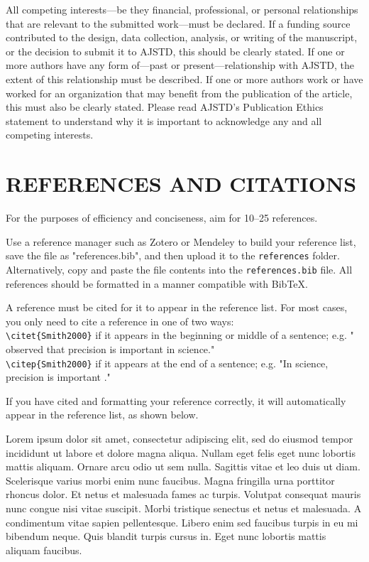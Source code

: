 \documentclass[twocolumn,twoside]{base/ajstd}
\begin{document}
All competing interests—be they financial, professional, or personal relationships that are relevant to the submitted work—must be declared. If a funding source contributed to the design, data collection, analysis, or writing of the manuscript, or the decision to submit it to AJSTD, this should be clearly stated. If one or more authors have any form of—past or present—relationship with AJSTD, the extent of this relationship must be described. If one or more authors work or have worked for an organization that may benefit from the publication of the article, this must also be clearly stated. Please read AJSTD’s Publication Ethics statement to understand why it is important to acknowledge any and all competing interests.

\section*{REFERENCES AND CITATIONS}

For the purposes of efficiency and conciseness, aim for 10--25 references.

Use a reference manager such as Zotero or Mendeley to build your reference list, save the file as "references.bib", and then upload it to the \verb|references| folder. Alternatively, copy and paste the file contents into the \verb|references.bib| file. All references should be formatted in a manner compatible with BibTeX. 

A reference must be cited for it to appear in the reference list. For most cases, you only need to cite a reference in one of two ways: \\

\noindent \verb|\citet{Smith2000}| if it appears in the beginning or middle of a sentence; e.g. "\citet{Smith2000} observed that precision is important in science." \\

\noindent \verb|\citep{Smith2000}| if it appears at the end of a sentence; e.g. "In science, precision is important \citep{Smith2000}."

If you have cited and formatting your reference correctly, it will automatically appear in the reference list, as shown below.














Lorem ipsum dolor sit amet, consectetur adipiscing elit, sed do eiusmod tempor incididunt ut labore et dolore magna aliqua. Nullam eget felis eget nunc lobortis mattis aliquam. Ornare arcu odio ut sem nulla. Sagittis vitae et leo duis ut diam. Scelerisque varius morbi enim nunc faucibus. Magna fringilla urna porttitor rhoncus dolor. Et netus et malesuada fames ac turpis. Volutpat consequat mauris nunc congue nisi vitae suscipit. Morbi tristique senectus et netus et malesuada. A condimentum vitae sapien pellentesque. Libero enim sed faucibus turpis in eu mi bibendum neque. Quis blandit turpis cursus in. Eget nunc lobortis mattis aliquam faucibus.
\end{document}
